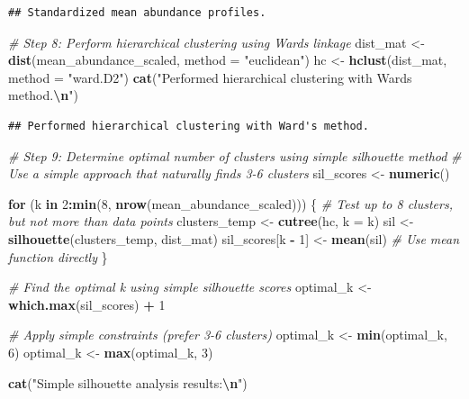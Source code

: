 \documentclass[
]{article}
\newenvironment{Shaded}{\begin{snugshade}}{\end{snugshade}}
\newcommand{\AttributeTok}[1]{\textcolor[rgb]{0.13,0.29,0.53}{#1}}
\newcommand{\CommentTok}[1]{\textcolor[rgb]{0.56,0.35,0.01}{\textit{#1}}}
\newcommand{\ControlFlowTok}[1]{\textcolor[rgb]{0.13,0.29,0.53}{\textbf{#1}}}
\newcommand{\DecValTok}[1]{\textcolor[rgb]{0.00,0.00,0.81}{#1}}
\newcommand{\FunctionTok}[1]{\textcolor[rgb]{0.13,0.29,0.53}{\textbf{#1}}}
\newcommand{\NormalTok}[1]{#1}
\newcommand{\OtherTok}[1]{\textcolor[rgb]{0.56,0.35,0.01}{#1}}
\newcommand{\SpecialCharTok}[1]{\textcolor[rgb]{0.81,0.36,0.00}{\textbf{#1}}}
\newcommand{\StringTok}[1]{\textcolor[rgb]{0.31,0.60,0.02}{#1}}
\begin{document}
\begin{verbatim}
## Standardized mean abundance profiles.
\end{verbatim}

\begin{Shaded}
\begin{Highlighting}[]
\CommentTok{\# Step 8: Perform hierarchical clustering using Ward\textquotesingle{}s linkage}
\NormalTok{dist\_mat }\OtherTok{\textless{}{-}} \FunctionTok{dist}\NormalTok{(mean\_abundance\_scaled, }\AttributeTok{method =} \StringTok{"euclidean"}\NormalTok{)}
\NormalTok{hc }\OtherTok{\textless{}{-}} \FunctionTok{hclust}\NormalTok{(dist\_mat, }\AttributeTok{method =} \StringTok{"ward.D2"}\NormalTok{)}
\FunctionTok{cat}\NormalTok{(}\StringTok{"Performed hierarchical clustering with Ward\textquotesingle{}s method.}\SpecialCharTok{\textbackslash{}n}\StringTok{"}\NormalTok{)}
\end{Highlighting}
\end{Shaded}

\begin{verbatim}
## Performed hierarchical clustering with Ward's method.
\end{verbatim}

\begin{Shaded}
\begin{Highlighting}[]
\CommentTok{\# Step 9: Determine optimal number of clusters using simple silhouette method}
\CommentTok{\# Use a simple approach that naturally finds 3{-}6 clusters}
\NormalTok{sil\_scores }\OtherTok{\textless{}{-}} \FunctionTok{numeric}\NormalTok{()}

\ControlFlowTok{for}\NormalTok{ (k }\ControlFlowTok{in} \DecValTok{2}\SpecialCharTok{:}\FunctionTok{min}\NormalTok{(}\DecValTok{8}\NormalTok{, }\FunctionTok{nrow}\NormalTok{(mean\_abundance\_scaled))) \{  }\CommentTok{\# Test up to 8 clusters, but not more than data points}
\NormalTok{  clusters\_temp }\OtherTok{\textless{}{-}} \FunctionTok{cutree}\NormalTok{(hc, }\AttributeTok{k =}\NormalTok{ k)}
\NormalTok{  sil }\OtherTok{\textless{}{-}} \FunctionTok{silhouette}\NormalTok{(clusters\_temp, dist\_mat)}
\NormalTok{  sil\_scores[k }\SpecialCharTok{{-}} \DecValTok{1}\NormalTok{] }\OtherTok{\textless{}{-}} \FunctionTok{mean}\NormalTok{(sil)  }\CommentTok{\# Use mean function directly}
\NormalTok{\}}

\CommentTok{\# Find the optimal k using simple silhouette scores}
\NormalTok{optimal\_k }\OtherTok{\textless{}{-}} \FunctionTok{which.max}\NormalTok{(sil\_scores) }\SpecialCharTok{+} \DecValTok{1}

\CommentTok{\# Apply simple constraints (prefer 3{-}6 clusters)}
\NormalTok{optimal\_k }\OtherTok{\textless{}{-}} \FunctionTok{min}\NormalTok{(optimal\_k, }\DecValTok{6}\NormalTok{)}
\NormalTok{optimal\_k }\OtherTok{\textless{}{-}} \FunctionTok{max}\NormalTok{(optimal\_k, }\DecValTok{3}\NormalTok{)}

\FunctionTok{cat}\NormalTok{(}\StringTok{"Simple silhouette analysis results:}\SpecialCharTok{\textbackslash{}n}\StringTok{"}\NormalTok{)}
\end{Highlighting}
\end{Shaded}
\end{document}
